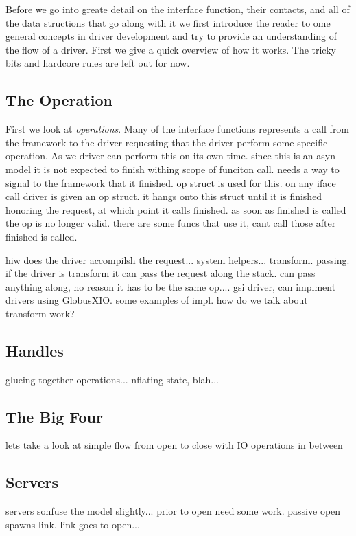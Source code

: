 \documentclass[11pt]{article}
\begin{document}
Before we go into greate detail on the interface function, their contacts,
and all of the data structions that go along with it we first introduce
the reader to ome general concepts in driver development and try to 
provide an understanding of the flow of a driver.
First we give a quick overview of how it works.  
The tricky bits and hardcore rules are left out for now.

\subsection{The Operation}
First we look at \emph{operations}.  Many of the interface functions
represents a call from the framework to the driver requesting that the 
driver perform some specific operation.  As we 
driver can perform this on its own time.  since this is an asyn model it 
is not expected to finish withing scope of funciton call.  needs a way to 
signal to the framework that it finished.  op struct is used for this.
on any iface call driver is given an op struct.  it hangs onto this
struct until it is finished honoring the request, at which point it calls
finished.  as soon as finished is called the op is no longer valid.  there
are some funcs that use it, cant call those after finished is called.

hiw does the driver accompilsh the request... system helpers... transform.
passing.  if the driver is transform it can pass the request along the stack.
can pass anything along, no reason it has to be the same op.... gsi driver,
can implment drivers using GlobusXIO.  some examples of impl.  
how do we talk about transform work?

\subsection{Handles}
glueing together operations... nflating state, blah...

\subsection{The Big Four}
lets take a look at simple flow from open to close with IO operations in
between

\subsection{Servers}
servers sonfuse the model slightly... prior to open need some work.  passive
open spawns link.  link goes to open...
\end{document}

